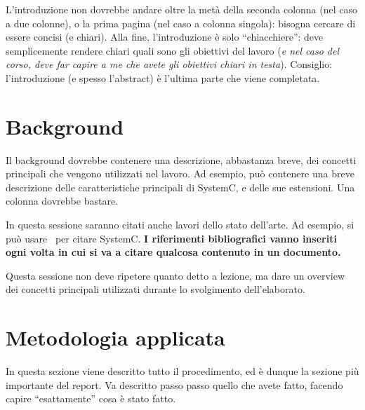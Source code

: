 \documentclass[]{IEEEtran}
\begin{document}
L'introduzione non dovrebbe andare oltre la met\`a della seconda colonna (nel caso a due colonne), o la prima pagina (nel caso a colonna singola): bisogna cercare di essere concisi (e chiari). Alla fine, l'introduzione \`e solo ``chiacchiere'': deve semplicemente rendere chiari quali sono gli obiettivi del lavoro (\emph{e nel caso del corso, deve far capire a me che avete gli obiettivi chiari in testa}). Consiglio: l'introduzione (e spesso l'abstract) \`e l'ultima parte che viene completata.

\section{Background}

Il background dovrebbe contenere una descrizione, abbastanza breve, dei concetti principali che vengono utilizzati nel lavoro. Ad esempio, pu\`o contenere una breve descrizione delle caratteristiche principali di SystemC, e delle sue estensioni. Una colonna dovrebbe bastare.

In questa sessione saranno citati anche lavori dello stato dell'arte. Ad esempio, si pu\`o usare~\cite{SystemC} per citare SystemC. \textbf{I riferimenti bibliografici vanno inseriti ogni volta in cui si va a citare qualcosa contenuto in un documento.}

Questa sessione non deve ripetere quanto detto a lezione, ma dare un overview dei concetti principali utilizzati durante lo svolgimento dell'elaborato.

\section{Metodologia applicata}

In questa sezione viene descritto tutto il procedimento, ed \`e dunque la sezione pi\`u importante del report. Va descritto passo passo quello che avete fatto, facendo capire ``esattamente'' cosa \`e stato fatto.
\end{document}
